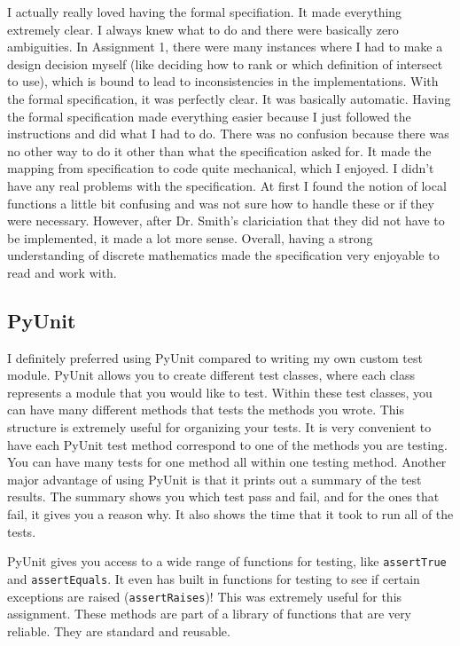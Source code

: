 \documentclass[12pt]{article}
\begin{document}
I actually really loved having the formal specifiation. It made everything extremely clear. I always knew what to do and there were basically zero ambiguities. In Assignment 1, there were many instances where I had to make a design decision myself (like deciding how to rank or which definition of intersect to use), which is bound to lead to inconsistencies in the implementations. With the formal specification, it was perfectly clear. It was basically automatic. Having the formal specification made everything easier because I just followed the instructions and did what I had to do. There was no confusion because there was no other way to do it other than what the specification asked for. It made the mapping from specification to code quite mechanical, which I enjoyed. I didn't have any real problems with the specification. At first I found the notion of local functions a little bit confusing and was not sure how to handle these or if they were necessary. However, after Dr. Smith's clariciation that they did not have to be implemented, it made a lot more sense. Overall, having a strong understanding of discrete mathematics made the specification very enjoyable to read and work with. 

\subsection{PyUnit}

I definitely preferred using PyUnit compared to writing my own custom test module. PyUnit allows you to create different test classes, where each class represents a module that you would like to test. Within these test classes, you can have many different methods that tests the methods you wrote. This structure is extremely useful for organizing your tests. It is very convenient to have each PyUnit test method correspond to one of the methods you are testing. You can have many tests for one method all within one testing method. Another major advantage of using PyUnit is that it prints out a summary of the test results. The summary shows you which test pass and fail, and for the ones that fail, it gives you a reason why. It also shows the time that it took to run all of the tests.

PyUnit gives you access to a wide range of functions for testing, like {\tt assertTrue} and {\tt assertEquals}. It even has built in functions for testing to see if certain exceptions are raised ({\tt assertRaises})! This was extremely useful for this assignment. These methods are part of a library of functions that are very reliable. They are standard and reusable. 
\end{document}
